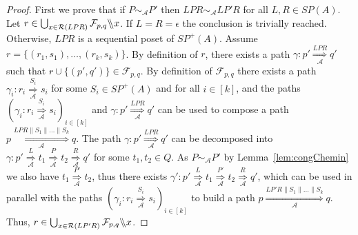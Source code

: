 \documentclass{CSML}
\newcommand{\quotientparallel}[2]{\ensuremath{#1\backslash\kern-3pt\backslash#2}}
\begin{document}
\begin{proof}
  First we prove that if $P\sim_{\mathcal{A}}P'$ then $LPR\sim_{\mathcal{A}}LP'R$ for all $L,R\in SP(A)$.
  Let $r\in\mathop\bigcup_{x\in\mathcal{R}(LPR)} \quotientparallel{\mathcal{F}_{p,q}}{x}$.
  If $L=R=\epsilon$ the conclusion is trivially reached.
  Otherwise, $LPR$ is a sequential poset of $SP^+(A)$.
  Assume $r=\{(r_1,s_1),\dots,(r_k,s_k)\}$. By definition of $r$, there exists a path $\gamma:p' \mathop{\Longrightarrow}\limits_{\mathcal{A}}^{LPR} q'$ such that $r\cup\{(p',q')\}\in \mathcal{F}_{p,q}$. By definition of $\mathcal{F}_{p,q}$ there exists a path $\gamma_i:r_i \mathop{\Longrightarrow}\limits_{\mathcal{A}}^{S_i} s_i$ for some $S_i\in SP^+(A)$ and for all $i\in[k]$, and the paths $(\gamma_i:r_i \mathop{\Longrightarrow}\limits_{\mathcal{A}}^{S_i} s_i)_{i\in[k]}$ and $\gamma:p' \mathop{\Longrightarrow}\limits_{\mathcal{A}}^{LPR} q'$ can be used to compose a path $p \mathop{\Longrightarrow}\limits_{\mathcal{A}}^{LPR\parallel S_1\parallel\dots\parallel S_k} q$. The path $\gamma:p' \mathop{\Longrightarrow}\limits_{\mathcal{A}}^{LPR} q'$ can be decomposed into $\gamma:p' \mathop{\Longrightarrow}\limits_{\mathcal{A}}^{L} t_1 \mathop{\Longrightarrow}\limits_{\mathcal{A}}^{P} t_2 \mathop{\Longrightarrow}\limits_{\mathcal{A}}^{R} q'$ for some $t_1,t_2\in Q$. As $P\sim_{\mathcal{A}}P'$ by Lemma~\ref{lem:congChemin} we also have $t_1 \mathop{\Longrightarrow}\limits_{\mathcal{A}}^{P'} t_2$, thus there exists $\gamma':p' \mathop{\Longrightarrow}\limits_{\mathcal{A}}^{L} t_1 \mathop{\Longrightarrow}\limits_{\mathcal{A}}^{P'} t_2 \mathop{\Longrightarrow}\limits_{\mathcal{A}}^{R} q'$, which can be used in parallel with the paths $(\gamma_i:r_i \mathop{\Longrightarrow}\limits_{\mathcal{A}}^{S_i} s_i)_{i\in[k]}$ to build a path  $p \mathop{\Longrightarrow}\limits_{\mathcal{A}}^{LP'R\parallel S_1\parallel\dots\parallel S_k} q$. Thus, $r\in \mathop\bigcup_{x\in\mathcal{R}(LP'R)} \quotientparallel{\mathcal{F}_{p,q}}{x}$.
  

\end{proof}
\end{document}
